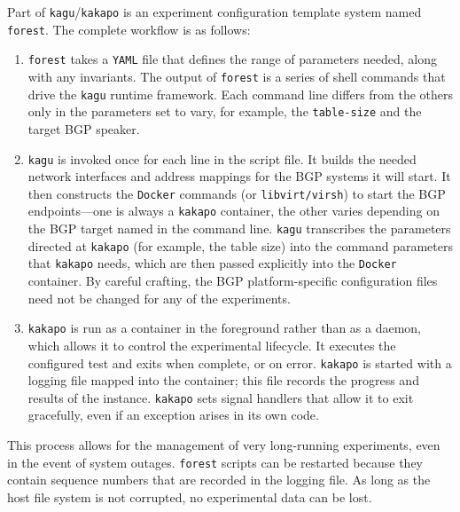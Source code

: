 Part of \texttt{kagu}/\texttt{kakapo} is an experiment configuration template system named \texttt{forest}. The complete workflow is as follows:
\begin{enumerate}
    \item \texttt{forest} takes a \texttt{YAML} file that defines the range of parameters needed, along with any invariants. The output of \texttt{forest} is a series of shell commands that drive the \texttt{kagu} runtime framework. Each command line differs from the others only in the parameters set to vary, for example, the \texttt{table-size} and the target BGP speaker.

    \item \texttt{kagu} is invoked once for each line in the script file. It builds the needed network interfaces and address mappings for the BGP systems it will start. It then constructs the \texttt{Docker} commands (or \texttt{libvirt/virsh}) to start the BGP endpoints---one is always a \texttt{kakapo} container, the other varies depending on the BGP target named in the command line. \texttt{kagu} transcribes the parameters directed at \texttt{kakapo} (for example, the table size) into the command parameters that \texttt{kakapo} needs, which are then passed explicitly into the \texttt{Docker} container. By careful crafting, the BGP platform-specific configuration files need not be changed for any of the experiments.

    \item \texttt{kakapo} is run as a container in the foreground rather than as a daemon, which allows it to control the experimental lifecycle. It executes the configured test and exits when complete, or on error. \texttt{kakapo} is started with a logging file mapped into the container; this file records the progress and results of the instance. \texttt{kakapo} sets signal handlers that allow it to exit gracefully, even if an exception arises in its own code.
\end{enumerate}

This process allows for the management of very long-running experiments, even in the event of system outages. \texttt{forest} scripts can be restarted because they contain sequence numbers that are recorded in the logging file. As long as the host file system is not corrupted, no experimental data can be lost.



